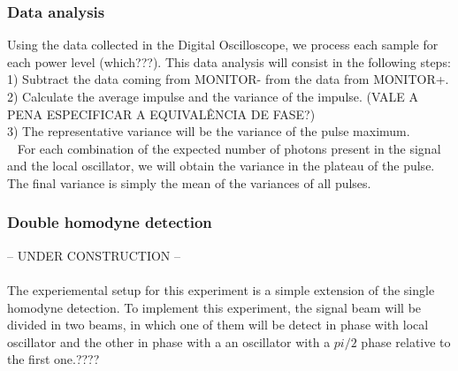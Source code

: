 \begin{bibunit}[plain]
\subsubsection{Data analysis}
%
Using the data collected in the Digital Oscilloscope, we process each sample for each power level (which???).
This data analysis will consist in the following steps:
1) Subtract the data coming from MONITOR- from the data from MONITOR+.\\
2) Calculate the average impulse and the variance of the impulse. (VALE A PENA ESPECIFICAR A EQUIVALÊNCIA DE FASE?)\\
3) The representative variance will be the variance of the pulse maximum.\\\
%
For each combination of the expected number of photons present in the signal and the local oscillator, we will obtain the variance in the plateau of the pulse. The final variance is simply the mean of the variances of all pulses.
%

\subsubsection{Double homodyne detection}
%
-- UNDER CONSTRUCTION --\\
\\
The experiemental setup for this experiment is a simple extension of the single homodyne detection. To implement this experiment, the signal beam will be divided in two beams, in which one of them will be detect in phase with local oscillator and the other in phase with a an oscillator with a $pi/2$ phase relative to the first one.????
%


\end{bibunit}
